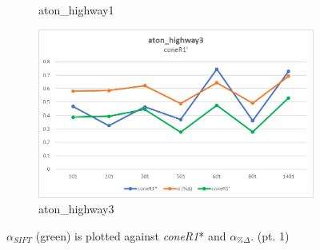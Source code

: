 \begin{appendices}
\begin{figure}
\begin{subfigure}{.45\linewidth}
  \caption{aton\_highway1}
\end{subfigure}
\hfill
\begin{subfigure}{.45\linewidth}
  \includegraphics[width=1\linewidth]{figures/appendix/highway3_prime.jpg}
  \caption{aton\_highway3}
\end{subfigure}

\caption{$\alpha_{SIFT}$ (green) is plotted against \textit{coneR1}* and $\alpha_{\%\Delta}$. (pt. 1)}
\end{figure}


\end{appendices}
